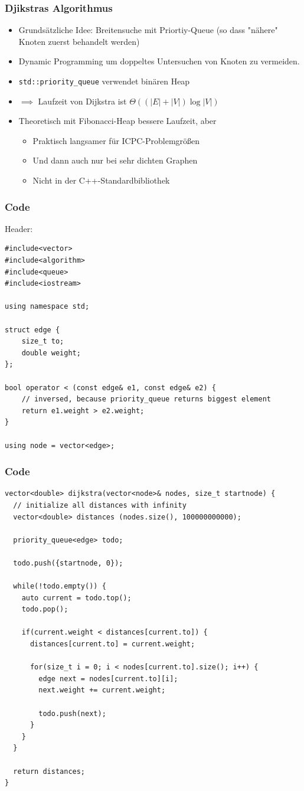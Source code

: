\begin{frame}
\frametitle{Djikstras Algorithmus}
\begin{itemize}
\item Grundsätzliche Idee: Breitensuche mit Priortiy-Queue (so dass "nähere" Knoten zuerst behandelt werden)
\item Dynamic Programming um doppeltes Untersuchen von Knoten zu vermeiden. 
\item \lstinline|std::priority_queue| verwendet binären Heap
\item $\implies$ Laufzeit von Dijkstra ist $\Theta((|E| + |V|) \log |V|)$
\item Theoretisch mit Fibonacci-Heap bessere Laufzeit, aber \begin{itemize}
\item Praktisch langsamer für ICPC-Problemgrößen
\item Und dann auch nur bei sehr dichten Graphen
\item Nicht in der C++-Standardbibliothek
\end{itemize}
\end{itemize}
\end{frame}

\begin{frame}[fragile]
\frametitle{Code}
Header: 
\begin{lstlisting}[basicstyle=\tiny]
#include<vector>
#include<algorithm>
#include<queue> 
#include<iostream>

using namespace std;

struct edge {
    size_t to;
    double weight;
};

bool operator < (const edge& e1, const edge& e2) {
    // inversed, because priority_queue returns biggest element
    return e1.weight > e2.weight;
}

using node = vector<edge>;
\end{lstlisting}

\end{frame}

\begin{frame}[fragile]
\frametitle{Code}
\begin{lstlisting}[basicstyle=\tiny]
vector<double> dijkstra(vector<node>& nodes, size_t startnode) {
  // initialize all distances with infinity
  vector<double> distances (nodes.size(), 100000000000);

  priority_queue<edge> todo;

  todo.push({startnode, 0});
  
  while(!todo.empty()) {
    auto current = todo.top();
    todo.pop();

    if(current.weight < distances[current.to]) {
      distances[current.to] = current.weight;

      for(size_t i = 0; i < nodes[current.to].size(); i++) {
        edge next = nodes[current.to][i];
        next.weight += current.weight;

        todo.push(next);
      }
    }
  }

  return distances;
}
\end{lstlisting}

\end{frame}


